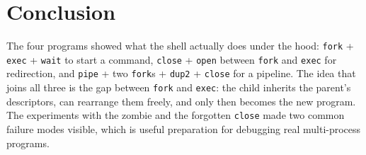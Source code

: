 \documentclass[12pt,a4paper]{article}
\begin{document}
\section*{Conclusion}

The four programs showed what the shell actually does under the hood: \texttt{fork} + \texttt{exec} + \texttt{wait} to start a command, \texttt{close} + \texttt{open} between \texttt{fork} and \texttt{exec} for redirection, and \texttt{pipe} + two \texttt{fork}s + \texttt{dup2} + \texttt{close} for a pipeline. The idea that joins all three is the gap between \texttt{fork} and \texttt{exec}: the child inherits the parent's descriptors, can rearrange them freely, and only then becomes the new program. The experiments with the zombie and the forgotten \texttt{close} made two common failure modes visible, which is useful preparation for debugging real multi-process programs.
\end{document}
